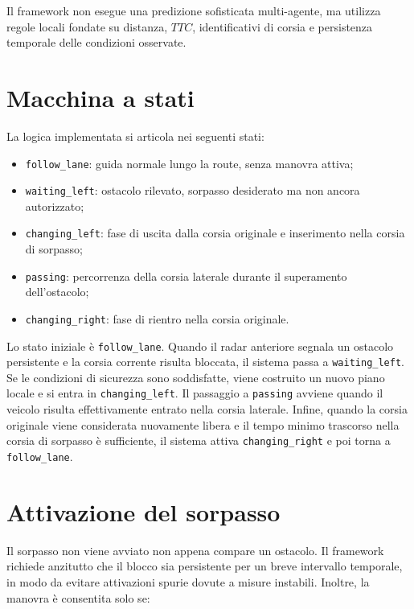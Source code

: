 Il framework non esegue una predizione sofisticata multi-agente, ma utilizza regole locali fondate su distanza, \(TTC\), identificativi di corsia e persistenza temporale delle condizioni osservate.

\section{Macchina a stati}

La logica implementata si articola nei seguenti stati:

\begin{itemize}
    \item \texttt{follow\_lane}: guida normale lungo la route, senza manovra attiva;
    \item \texttt{waiting\_left}: ostacolo rilevato, sorpasso desiderato ma non ancora autorizzato;
    \item \texttt{changing\_left}: fase di uscita dalla corsia originale e inserimento nella corsia di sorpasso;
    \item \texttt{passing}: percorrenza della corsia laterale durante il superamento dell'ostacolo;
    \item \texttt{changing\_right}: fase di rientro nella corsia originale.
\end{itemize}

Lo stato iniziale è \texttt{follow\_lane}. Quando il radar anteriore segnala un ostacolo persistente e la corsia corrente risulta bloccata, il sistema passa a \texttt{waiting\_left}. Se le condizioni di sicurezza sono soddisfatte, viene costruito un nuovo piano locale e si entra in \texttt{changing\_left}. Il passaggio a \texttt{passing} avviene quando il veicolo risulta effettivamente entrato nella corsia laterale. Infine, quando la corsia originale viene considerata nuovamente libera e il tempo minimo trascorso nella corsia di sorpasso è sufficiente, il sistema attiva \texttt{changing\_right} e poi torna a \texttt{follow\_lane}.

\section{Attivazione del sorpasso}

Il sorpasso non viene avviato non appena compare un ostacolo. Il framework richiede anzitutto che il blocco sia persistente per un breve intervallo temporale, in modo da evitare attivazioni spurie dovute a misure instabili. Inoltre, la manovra è consentita solo se:


